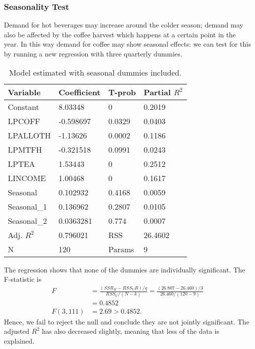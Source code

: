 \documentclass[12pt]{article}
\begin{document}
\subsubsection{Seasonality Test} %
\label{ssub:seasonality}
Demand for hot beverages may increase around the colder season; demand may also be affected by the coffee harvest which happens at a certain point in the year. In this way demand for coffee may show seasonal effects: we can test for this by running a new regression with three quarterly dummies.
\begin{table}[!htb]\centering\caption{\label{tb:sdumm} Model estimated with seasonal dummies included.}
\begin{tabular}{llll}
\textbf{Variable} & \textbf{Coefficient} & \textbf{T-prob} & \textbf{Partial \(R^2\)} \\\hline
Constant          & 8.03348              & 0               & 0.2019         \\
LPCOFF            & -0.598697            & 0.0329          & 0.0403         \\
LPALLOTH          & -1.13626             & 0.0002          & 0.1186         \\
LPMTFH            & -0.321518            & 0.0991          & 0.0243         \\
LPTEA             & 1.53443              & 0               & 0.2512         \\
LINCOME           & 1.00468              & 0               & 0.1617         \\
Seasonal          & 0.102932             & 0.4168          & 0.0059         \\
Seasonal\_1       & 0.136962             & 0.2807          & 0.0105         \\
Seasonal\_2       & 0.0363281            & 0.774           & 0.0007        \\\hline
Adj. \(R^2\)				& 0.796021				& RSS				& 26.4602 \\
N				& 120					& Params			& 9

\end{tabular}
\end{table}

The regression shows that none of the dummies are individually significant. The F-statistic is 
\begin{align*}
F &= \frac{(SSR_R - RSS_UR)/q}{RSS_U/(N-k)} = \frac{(26.807 - 26.460)/3}{26.460/(120-9)}\\ &= 0.4852 \\
F(3,111) &= 2.69 > 0.4852.
\end{align*}
Hence, we fail to reject the null and conclude they are not jointly significant. The adjusted \(R^2\) has also decreased slightly, meaning that less of the data is explained.
\end{document}
